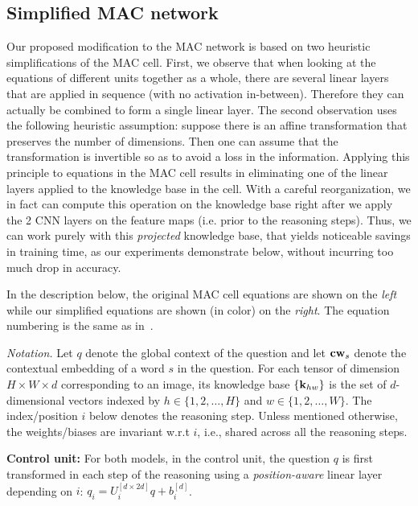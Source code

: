 \subsection{Simplified MAC network}
Our proposed modification to the MAC network is based on two heuristic
simplifications of the MAC cell. 
First, we observe that when looking at the equations of different units
together as a whole, there are several linear layers
that are applied in sequence (with no activation in-between).
Therefore they can actually be combined to form a single linear layer.
The second observation uses the following heuristic assumption:
suppose there is an affine transformation that preserves the number
of dimensions. Then one can assume that the transformation is invertible
so as to avoid a loss in the information. Applying this principle to 
equations in the MAC cell results in eliminating one of the linear layers applied to
the knowledge base in the cell. With a careful reorganization, we in fact
can compute this operation on the knowledge base right after we apply the 2 
 CNN layers on the feature maps (i.e. prior to the reasoning steps). Thus, we can work purely
with this \emph{projected} knowledge base, that yields
noticeable savings in training time, as our experiments demonstrate
below, without incurring too much drop in accuracy.

In the description below, the original MAC cell equations are shown on the \emph{left}
while our simplified equations are shown (in color) on the {\color{Plum} \emph{right}}.
The equation numbering is the same as in~\cite{hudson2018compositional}.

\noindent\textit{Notation.}
Let $q$ denote the global context of the question
and let $\mathbf{cw}_s$ denote the contextual embedding of a word $s$ in the question.
For each tensor of dimension $H \times W \times d$ corresponding to an image,
its knowledge base $\{ \mathbf{k}_{hw}\}$ is the set of $d$-dimensional vectors indexed by 
$h \in \{1,2,\dots,H\}$ and $w \in \{1,2,\dots, W\}$.
The index/position $i$ below denotes the reasoning step. 
Unless mentioned otherwise, the weights/biases are invariant w.r.t $i$, 
i.e., shared across all the reasoning steps. 

\noindent\textbf{Control unit:} 
For both models, in the control unit, the question $q$ is first transformed in each step of 
the reasoning using a \emph{position-aware}
linear layer depending on $i$: $q_i = U_i^{[d \times 2d]} q + b_i^{[d]}$.


